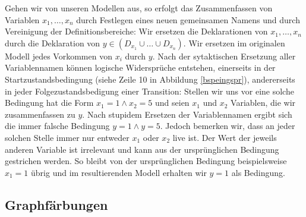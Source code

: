 \documentclass[a4paper]{article}
\theoremstyle{nonumberplain}
\begin{document}
Gehen wir von unseren Modellen aus, so erfolgt das Zusammenfassen von Variablen $x_1, \dots , x_n$ durch Festlegen eines neuen gemeinsamen Namens und durch Vereinigung der Definitionsbereiche: Wir ersetzen die Deklarationen von $x_1, \dots , x_n$ durch die Deklaration von $y \in (D_{x_1} \cup \dots \cup D_{x_n})$. Wir ersetzen im originalen Modell jedes Vorkommen von $x_i$ durch $y$. Nach der sytaktischen Ersetzung aller Variablennamen können logische Widersprüche entstehen, einerseits in der Startzustandsbedingung (siehe Zeile 10 in Abbildung \ref{bspeingspr}), andererseits in jeder Folgezustandsbedigung einer Transition: Stellen wir uns vor eine solche Bedingung hat die Form $x_1 = 1 \land x_2 = 5$ und seien $x_1$ und $x_2$ Variablen, die wir zusammenfassen zu $y$. Nach stupidem Ersetzen der Variablennamen ergibt sich die immer falsche Bedingung $y = 1 \land y = 5$. Jedoch bemerken wir, dass an jeder solchen Stelle immer nur entweder $x_1$ oder $x_2$ live ist. Der Wert der jeweils anderen Variable ist irrelevant und kann aus der ursprünglichen Bedingung gestrichen werden. So bleibt von der ursprünglichen Bedingung beispielsweise $x_1 = 1$ übrig und im resultierenden Modell erhalten wir $y = 1$ als Bedingung.

\begin{comment}
	\subsection{Modellreduktion mittels Live Range Analysis}
	
	
	
	Nach Anwendung des Standardverfahrens zur live range analysis erhalten wir die Abbildung
	\begin{equation*}
	\mbox{live\_vars} : V \to 2^{\mbox{Var}} : v \mapsto \mathrm{LIVE}^{out}_{(*,v)}\text{,}
	\end{equation*}
	welche uns zu jedem Zustand $v \in V$ der Kontrollflussvariablen $cf$ die Menge aller Variablen gibt, welche in dem Moment live sind, wenn $cf$ den Wert $v$ annimmt.
	
	Wir bemerken, es besteht nun die Möglichkeit zwei Variablen $x, y$ zu einer Variablen $z$ zusammenzufassen,
	wenn diese in keinem Knoten $v \in V$ beide live sind. Die resultierende zusammengefasste Variable $z$ ist sodann überall live, wo zuvor $x$ oder $y$ live war.
	
\end{comment}

\subsection{Graphfärbungen}
\end{document}
